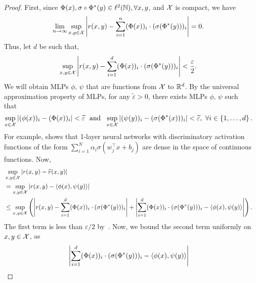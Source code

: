 \begin{proof}
    First, since $\Phi(x), \sigma \circ \Phi^*(y) \in \ell^2({\mathbb{N}}), \forall x, y$, and ${\mathcal{X}}$ is compact, we have
    \begin{equation*}
        \lim_{n \to \infty} \sup_{x,y \in \calX} \abs{r(x, y) - \sum_{i=1}^{n} (\Phi(x))_i \cdot (\sigma(\Phi^*(y)))_i} = 0.
    \end{equation*}
    Thus, let $d$ be such that,
    \begin{equation}\label{eq:thm1_proof_eq1}
        \sup_{x,y \in \calX} \abs{r(x, y) - \sum_{i=1}^{d} (\Phi(x))_i \cdot (\sigma(\Phi^*(y)))_i} < \frac{\varepsilon}{2}.
    \end{equation}
    We will obtain MLPs $\phi,\, \psi$ that are functions from ${\mathcal{X}}$ to $\mathbb{R}^{d}$. 
    By the universal approximation property of MLPs, for any $\tilde{\varepsilon} > 0$, there exists MLPs $\phi,\,\psi$ such that
    \begin{equation}\label{eq:thm1_proof_eq2}
        \sup_{x \in \calX} \abs{(\phi(x))_i - (\Phi(x))_{i}} < \tilde{\varepsilon} \ \text{ and } \ \sup_{x \in \calX} \abs{(\psi(y))_i - (\sigma(\Phi^*(x)))_{i}} < \tilde{\varepsilon}, \ \forall i \in \set{1, \ldots, d}.
    \end{equation}
    For example, \citet{cybenkoApproximationSuperpositions1989} shows that 1-layer neural networks with discriminatory activation functions of the form $\sum_{i=1}^{N} \alpha_i \sigma(w_j^\top x + b_j)$ are dense in the space of continuous functions.
    Now,
    \begin{align*}
        &\sup_{x,y \in \calX} \abs{r(x,y) - \hat{r}(x,y)} \\
        &= \sup_{x,y \in \calX} \abs{r(x,y) - \iprod{\phi(x)}{\psi(y)}} \\
        &\leq \sup_{x,y\in \calX} \paren{\abs{r(x,y) - \sum_{i=1}^{d} (\Phi(x))_i \cdot (\sigma(\Phi^*(y)))_i} + \abs{\sum_{i=1}^{d} (\Phi(x))_i \cdot (\sigma(\Phi^*(y)))_i - \iprod{\phi(x)}{\psi(y)}}}.
    \end{align*}
    The first term is less than $\varepsilon / 2$ by~. Now, we bound the second term uniformly on $x,y \in {\mathcal{X}}$, as
    \begin{align*}
        &\abs{\sum_{i=1}^{d} (\Phi(x))_i \cdot (\sigma(\Phi^*(y)))_i - \iprod{\phi(x)}{\psi(y)}} \\

\end{align*}
\end{proof}
